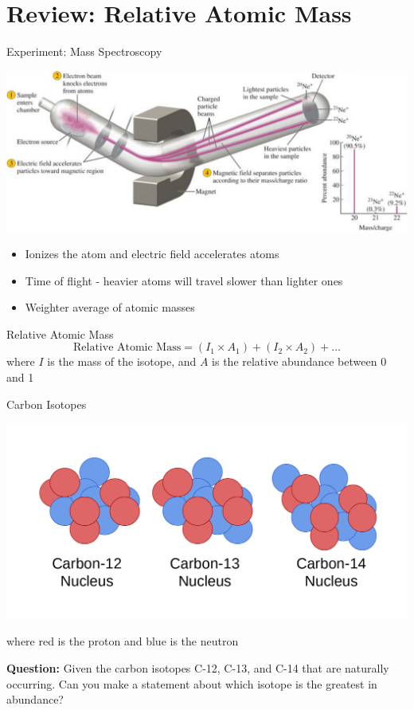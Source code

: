 \documentclass[11pt]{beamer}
\begin{document}
\section{Review: Relative Atomic Mass}

\begin{frame}{Experiment: Mass Spectroscopy}
  \begin{center}
    \includegraphics[width=\linewidth]{mass_spect}
  \end{center}

  \begin{itemize}
  \item Ionizes the atom and electric field accelerates atoms
  \item Time of flight - heavier atoms will travel slower
    than lighter ones
  \item Weighter average of atomic masses
  \end{itemize}  
\end{frame}

\begin{frame}{Relative Atomic Mass}
  \begin{equation}
    \text{Relative Atomic Mass} = (I_1\times A_1) + (I_2\times A_2) + \dots
  \end{equation}
  where $I$ is the mass of the isotope, and $A$ is the
  relative abundance between 0 and 1
\end{frame}

\begin{frame}{Carbon Isotopes}
  \begin{center}
    \includegraphics[scale=0.2]{carbon_isotopes}
  \end{center}
  where red is the proton and blue is the neutron
  
  \textbf{Question:} Given the carbon isotopes C-12, C-13, and C-14
  that are naturally occurring. Can you make a statement about which
  isotope is the greatest in abundance?
\end{frame}
\end{document}
